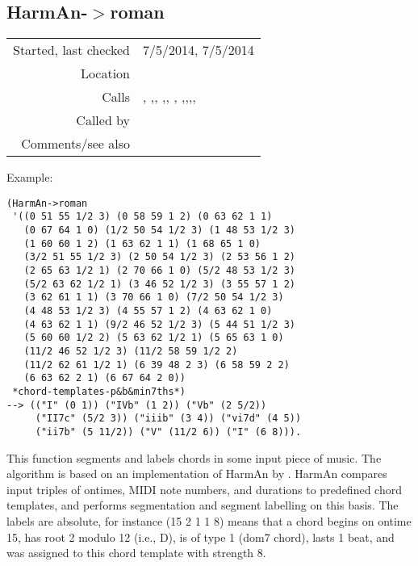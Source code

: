 \subsection*{HarmAn-$>$roman}\label{fun:HarmAn->roman}

\vspace{0.3cm}
\begin{tabular}{r|p{8cm}}
Started, last checked & 7/5/2014, 7/5/2014 \\
Location & \nameref{sec:chord-labelling} \\
Calls & \nameref{fun:centre-dataset}, \nameref{fun:constant-vector},\newline \nameref{fun:fifth-steps-mode}, \nameref{fun:HarmAn->labelling},\newline \nameref{fun:min-argmin}, \nameref{fun:my-last}, \nameref{fun:nth-list-of-lists},\newline  \nameref{fun:orthogonal-projection-unique-equalp},\newline \nameref{fun:resolve-dim7s-roman},\newline \nameref{fun:restrict-point-set-to-MNN-mod12},\newline \nameref{fun:segments-strict} \\
Called by & \\
Comments/see also &
\end{tabular}

\vspace{0.5cm}
\noindent Example:
\begin{verbatim}
(HarmAn->roman
 '((0 51 55 1/2 3) (0 58 59 1 2) (0 63 62 1 1)
   (0 67 64 1 0) (1/2 50 54 1/2 3) (1 48 53 1/2 3)
   (1 60 60 1 2) (1 63 62 1 1) (1 68 65 1 0)
   (3/2 51 55 1/2 3) (2 50 54 1/2 3) (2 53 56 1 2)
   (2 65 63 1/2 1) (2 70 66 1 0) (5/2 48 53 1/2 3)
   (5/2 63 62 1/2 1) (3 46 52 1/2 3) (3 55 57 1 2)
   (3 62 61 1 1) (3 70 66 1 0) (7/2 50 54 1/2 3)
   (4 48 53 1/2 3) (4 55 57 1 2) (4 63 62 1 0)
   (4 63 62 1 1) (9/2 46 52 1/2 3) (5 44 51 1/2 3)
   (5 60 60 1/2 2) (5 63 62 1/2 1) (5 65 63 1 0)
   (11/2 46 52 1/2 3) (11/2 58 59 1/2 2)
   (11/2 62 61 1/2 1) (6 39 48 2 3) (6 58 59 2 2)
   (6 63 62 2 1) (6 67 64 2 0))
 *chord-templates-p&b&min7ths*)
--> (("I" (0 1)) ("IVb" (1 2)) ("Vb" (2 5/2))
     ("II7c" (5/2 3)) ("iiib" (3 4)) ("vi7d" (4 5))
     ("ii7b" (5 11/2)) ("V" (11/2 6)) ("I" (6 8))).
\end{verbatim}

\noindent This function segments and labels chords in
some input piece of music. The algorithm is based on
an implementation of HarmAn by \cite{pardo2002}.
HarmAn compares input triples of ontimes, MIDI note
numbers, and durations to predefined chord templates,
and performs segmentation and segment labelling on
this basis. The labels are absolute, for instance
(15 2 1 1 8) means that a chord begins on ontime 15,
has root 2 modulo 12 (i.e., D), is of type 1 (dom7
chord), lasts 1 beat, and was assigned to this chord
template with strength 8.

